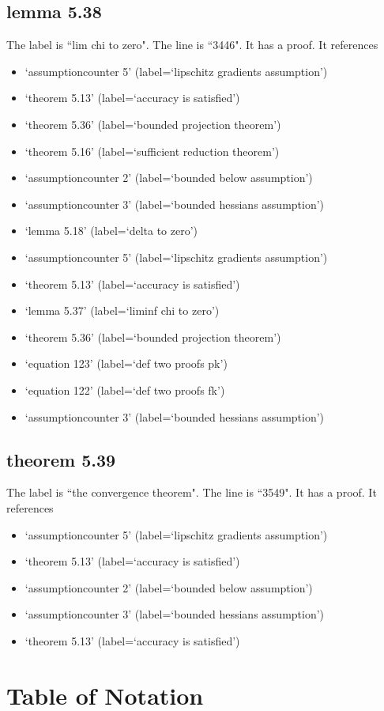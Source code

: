 \documentclass{article}
\begin{document}
\subsection{lemma 5.38}
The label is ``lim chi to zero".
The line is ``3446".
It has a proof.
It references \begin{itemize}
\item `assumptioncounter 5' (label=`lipschitz gradients assumption')
\item `theorem 5.13' (label=`accuracy is satisfied')
\item `theorem 5.36' (label=`bounded projection theorem')
\item `theorem 5.16' (label=`sufficient reduction theorem')
\item `assumptioncounter 2' (label=`bounded below assumption')
\item `assumptioncounter 3' (label=`bounded hessians assumption')
\item `lemma 5.18' (label=`delta to zero')
\item `assumptioncounter 5' (label=`lipschitz gradients assumption')
\item `theorem 5.13' (label=`accuracy is satisfied')
\item `lemma 5.37' (label=`liminf chi to zero')
\item `theorem 5.36' (label=`bounded projection theorem')
\item `equation 123' (label=`def two proofs pk')
\item `equation 122' (label=`def two proofs fk')
\item `assumptioncounter 3' (label=`bounded hessians assumption')
\end{itemize}
\subsection{theorem 5.39}
The label is ``the convergence theorem".
The line is ``3549".
It has a proof.
It references \begin{itemize}
\item `assumptioncounter 5' (label=`lipschitz gradients assumption')
\item `theorem 5.13' (label=`accuracy is satisfied')
\item `assumptioncounter 2' (label=`bounded below assumption')
\item `assumptioncounter 3' (label=`bounded hessians assumption')
\item `theorem 5.13' (label=`accuracy is satisfied')
\end{itemize}
\section{Table of Notation}
\end{document}
